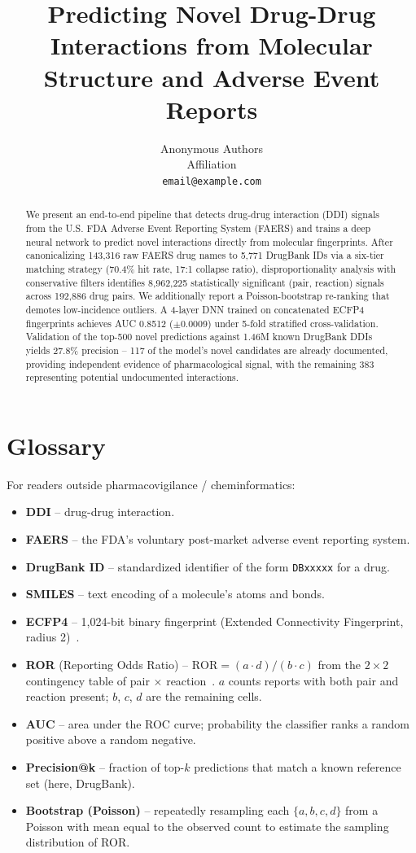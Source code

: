 \documentclass{article}
\title{Predicting Novel Drug-Drug Interactions from Molecular Structure and Adverse Event Reports}
\author{%
  Anonymous Authors\\
  Affiliation\\
  \texttt{email@example.com}
}
\begin{document}
\maketitle

\begin{abstract}
We present an end-to-end pipeline that detects drug-drug interaction (DDI) signals
from the U.S. FDA Adverse Event Reporting System (FAERS) and trains a deep neural
network to predict novel interactions directly from molecular fingerprints. After
canonicalizing 143,316 raw FAERS drug names to 5,771 DrugBank IDs via a six-tier
matching strategy (70.4\% hit rate, 17:1 collapse ratio), disproportionality
analysis with conservative filters identifies 8,962,225 statistically
significant (pair, reaction) signals across 192,886 drug pairs. We additionally
report a Poisson-bootstrap re-ranking that demotes low-incidence outliers. A
4-layer DNN trained on concatenated ECFP4 fingerprints achieves AUC
0.8512 ($\pm$0.0009) under 5-fold stratified cross-validation.
Validation of the top-500 novel predictions against 1.46M known DrugBank DDIs
yields 27.8\% precision -- 117 of the model's novel candidates are
already documented, providing independent evidence of pharmacological signal, with
the remaining 383 representing potential undocumented interactions.
\end{abstract}

\section{Glossary}\label{sec:glossary}
For readers outside pharmacovigilance / cheminformatics:
\begin{itemize}\itemsep 1pt
\item \textbf{DDI} -- drug-drug interaction.
\item \textbf{FAERS} -- the FDA's voluntary post-market adverse event reporting system.
\item \textbf{DrugBank ID} -- standardized identifier of the form \texttt{DBxxxxx} for a drug.
\item \textbf{SMILES} -- text encoding of a molecule's atoms and bonds.
\item \textbf{ECFP4} -- 1{,}024-bit binary fingerprint (Extended Connectivity Fingerprint, radius 2)~\cite{rogers2010ecfp}.
\item \textbf{ROR} (Reporting Odds Ratio) -- $\mathrm{ROR}=(a\cdot d)/(b\cdot c)$ from the $2\!\times\!2$ contingency table of pair $\times$ reaction~\cite{vanpuijenbroek2002ror}. $a$ counts reports with both pair and reaction present; $b$, $c$, $d$ are the remaining cells.
\item \textbf{AUC} -- area under the ROC curve; probability the classifier ranks a random positive above a random negative.
\item \textbf{Precision@k} -- fraction of top-$k$ predictions that match a known reference set (here, DrugBank).
\item \textbf{Bootstrap (Poisson)} -- repeatedly resampling each $\{a,b,c,d\}$ from a Poisson with mean equal to the observed count to estimate the sampling distribution of ROR.
\end{itemize}
\end{document}
